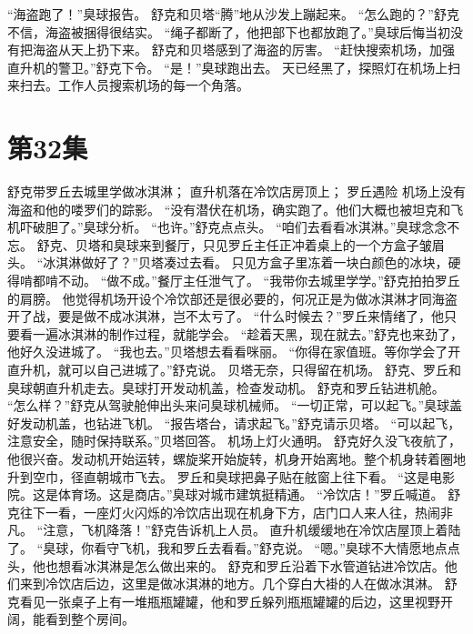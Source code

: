 \documentclass[a4paper,12pt,UTF8,twoside]{ctexbook}
\begin{document}
        “海盗跑了！”臭球报告。 
        舒克和贝塔“腾”地从沙发上蹦起来。 
        “怎么跑的？”舒克不信，海盗被捆得很结实。 
        “绳子都断了，他把部下也都放跑了。”臭球后悔当初没有把海盗从天上扔下来。 
        舒克和贝塔感到了海盗的厉害。 
        “赶快搜索机场，加强直升机的警卫。”舒克下令。 
        “是！”臭球跑出去。 
        天已经黑了，探照灯在机场上扫来扫去。工作人员搜索机场的每一个角落。   \chapter{第32集} 
        舒克带罗丘去城里学做冰淇淋； 
        直升机落在冷饮店房顶上； 
        罗丘遇险   
        机场上没有海盗和他的喽罗们的踪影。 
        “没有潜伏在机场，确实跑了。他们大概也被坦克和飞机吓破胆了。”臭球分析。 
        “也许。”舒克点点头。 
        “咱们去看看冰淇淋。”臭球念念不忘。 
        舒克、贝塔和臭球来到餐厅，只见罗丘主任正冲着桌上的一个方盒子皱眉头。 
        “冰淇淋做好了？”贝塔凑过去看。 
        只见方盒子里冻着一块白颜色的冰块，硬得啃都啃不动。 
        “做不成。”餐厅主任泄气了。 
        “我带你去城里学学。”舒克拍拍罗丘的肩膀。 
        他觉得机场开设个冷饮部还是很必要的，何况正是为做冰淇淋才同海盗开了战，要是做不成冰淇淋，岂不太亏了。 
        “什么时候去？”罗丘来情绪了，他只要看一遍冰淇淋的制作过程，就能学会。 
        “趁着天黑，现在就去。”舒克也来劲了，他好久没进城了。 
        “我也去。”贝塔想去看看咪丽。 
        “你得在家值班。等你学会了开直升机，就可以自己进城了。”舒克说。 
        贝塔无奈，只得留在机场。 
        舒克、罗丘和臭球朝直升机走去。臭球打开发动机盖，检查发动机。 
        舒克和罗丘钻进机舱。 
        “怎么样？”舒克从驾驶舱伸出头来问臭球机械师。 
        “一切正常，可以起飞。”臭球盖好发动机盖，也钻进飞机。 
        “报告塔台，请求起飞。”舒克请示贝塔。 
        “可以起飞，注意安全，随时保持联系。”贝塔回答。 
        机场上灯火通明。 
        舒克好久没飞夜航了，他很兴奋。发动机开始运转，螺旋桨开始旋转，机身开始离地。整个机身转着圈地升到空巾，径直朝城市飞去。 
        罗丘和臭球把鼻子贴在舷窗上往下看。 
        “这是电影院。这是体育场。这是商店。”臭球对城市建筑挺精通。 
        “冷饮店！”罗丘喊道。 
        舒克往下一看，一座灯火闪烁的冷饮店出现在机身下方，店门口人来人往，热闹非凡。 
        “注意，飞机降落！”舒克告诉机上人员。 
        直升机缓缓地在冷饮店屋顶上着陆了。 
        “臭球，你看守飞机，我和罗丘去看看。”舒克说。 
        “嗯。”臭球不大情愿地点点头，他也想看冰淇淋是怎么做出来的。 
        舒克和罗丘沿着下水管道钻进冷饮店。他们来到冷饮店后边，这里是做冰淇淋的地方。几个穿白大褂的人在做冰淇淋。 
        舒克看见一张桌子上有一堆瓶瓶罐罐，他和罗丘躲列瓶瓶罐罐的后边，这里视野开阔，能看到整个房间。 
\end{document}
